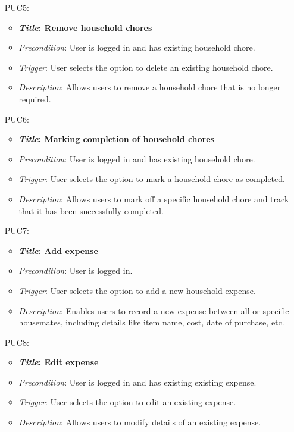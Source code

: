 \documentclass[12pt]{article}
\begin{document}
\begin{itemize}
    \item[PUC5:]
        \begin{itemize}
            \item \textbf{\textit{Title}: Remove household chores}
            \item \textit{Precondition}: User is logged in and has existing household chore.
            \item \textit{Trigger}: User selects the option to delete an existing household chore.
            \item \textit{Description}: Allows users to remove a household chore that is no longer required.
    \end{itemize}

    \item[PUC6:]
        \begin{itemize}
            \item \textbf{\textit{Title}: Marking completion of household chores}
            \item \textit{Precondition}: User is logged in and has existing household chore.
            \item \textit{Trigger}: User selects the option to mark a household chore as completed.
            \item \textit{Description}: Allows users to mark off a specific household chore and track that it has been successfully completed.
    \end{itemize}

    \item[PUC7:]
        \begin{itemize}
            \item \textbf{\textit{Title}: Add expense}
            \item \textit{Precondition}: User is logged in.
            \item \textit{Trigger}: User selects the option to add a new household expense.
            \item \textit{Description}: Enables users to record a new expense between all or specific housemates, including details like item name, cost, date of purchase, etc.
    \end{itemize}

    \item[PUC8:]
        \begin{itemize}
            \item \textbf{\textit{Title}: Edit expense}
            \item \textit{Precondition}: User is logged in and has existing existing expense.
            \item \textit{Trigger}: User selects the option to edit an existing expense.
            \item \textit{Description}: Allows users to modify details of an existing expense.
    \end{itemize}


\end{itemize}
\end{document}
